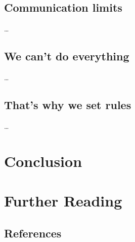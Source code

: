 %
\subsection{Communication limits}

  \begin{frame}{\insertsection}
    \dots
  \end{frame}

%
\subsection{We can't do everything}

  \begin{frame}{\insertsection}
    \dots
  \end{frame}

%
\subsection{That's why we set rules}

  \begin{frame}{\insertsection}
    \dots
  \end{frame}

\section*{Conclusion}

  \begin{frame}{\insertsection}
  \end{frame}

\appendix

\section{Further Reading}

%
\subsection{References}

  \begin{frame}{\insertsubsection}
    {}
    
    \nocite{maturana2004maquinas}
    \nocite{johnson2002emergence}
    \nocite{beck2004extreme}
    \nocite{pink2011drive}
  \end{frame}

